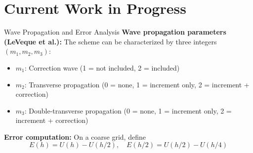 \section{Current Work in Progress}
	\scriptsize
    \begin{frame}{Wave Propagation and Error Analysis}
    	\scriptsize
    	\textbf{Wave propagation parameters (LeVeque et al.):}
    	The scheme can be characterized by three integers $(m_1, m_2, m_3)$:
    	\begin{itemize}
    		\item $m_1$: Correction wave (1 = not included, 2 = included)
    		\item $m_2$: Transverse propagation (0 = none, 1 = increment only, 2 = increment + correction)
    		\item $m_3$: Double-transverse propagation (0 = none, 1 = increment only, 2 = increment + correction)
    	\end{itemize}
    	
    	\medskip
    	\textbf{Error computation:}  
    	On a coarse grid, define
    	\[
    	E(h) = U(h) - U(h/2), \quad
    	E(h/2) = U(h/2) - U(h/4)
    	\]
    \end{frame}
    
    
